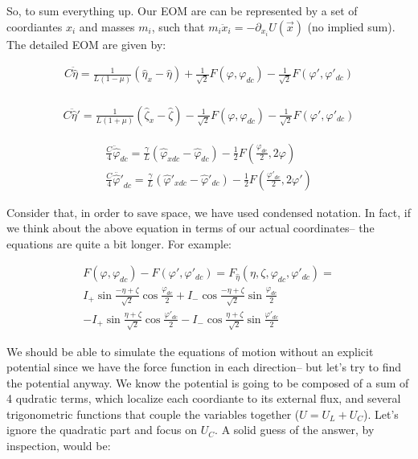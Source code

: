 \documentclass[paper=a4, twocolumn, fontsize=10pt]{article} %
\numberwithin{equation}{section} %
\numberwithin{figure}{section} %
\numberwithin{table}{section} %
\def \df#1{\hat{#1}}
\def \dl#1{#1}
\begin{document}
So, to sum everything up. Our EOM are can be represented by a set of coordiantes $x_i$ and masses $m_i$, such that $m_i \ddot{x}_i = -\partial_{x_i} U(\vec{x})$ (no implied sum). The detailed EOM are given by:


\begin{multline}
    C \ddot{\df\eta} = \frac{1}{L(1-\mu)} (\df\eta_x-\df\eta) +\frac{1}{\sqrt{2}} F(\dl\varphi, \dl\varphi_{dc}) - \frac{1}{\sqrt{2}} F(\dl\varphi', \dl\varphi'_{dc})
\end{multline}
    \\
\begin{multline}
    C \ddot{\df\eta}' = \frac{1}{L(1+\mu)} (\df\zeta_x-\df\zeta) - \frac{1}{\sqrt{2}} F(\dl\varphi, \dl\varphi_{dc}) - \frac{1}{\sqrt{2}} F(\dl\varphi', \dl\varphi'_{dc})
\end{multline}

\begin{align}
\frac{C}{4} \ddot{\df\varphi}_{dc} = \frac{\gamma}{L}\left( \df\varphi_{xdc} -\df\varphi_{dc}\right) -  \frac{1}{2} F(\frac{\dl\varphi_{dc}}{2}, 2\dl\varphi) \\
\frac{C}{4} \ddot{\df\varphi'}_{dc} = \frac{\gamma}{L}\left( \df\varphi'_{xdc} -\df\varphi'_{dc}\right) -  \frac{1}{2}F(\frac{\dl\varphi'_{dc}}{2}, 2\dl\varphi')
    \end{align}

Consider that, in order to save space, we have used condensed notation. In fact, if we think about the above equation in terms of our actual coordinates-- the equations are quite a bit longer. For example:


\begin{multline}
    F(\dl\varphi, \dl\varphi_{dc}) - F(\dl\varphi', \dl\varphi'_{dc}) = F_{\df\eta}(\dl\eta,\dl\zeta,\dl\varphi_{dc},\dl\varphi'_{dc})   =  \\
    I_{+} \sin \frac{-\dl\eta+\dl\zeta}{\sqrt2} \cos \frac{\dl\varphi_{dc}}{2} + I_{-} \cos \frac{-\dl\eta+\dl\zeta}{\sqrt2} \sin \frac{\dl\varphi_{dc}}{2} \\
    - I_{+} \sin \frac{\dl\eta+\dl\zeta}{\sqrt2} \cos \frac{\dl\varphi'_{dc}}{2} - I_{-} \cos \frac{\dl\eta+\dl\zeta}{\sqrt2} \sin \frac{\dl\varphi'_{dc}}{2} 
\end{multline}

We should be able to simulate the equations of motion without an explicit potential since we have the force function in each direction-- but let's try to find the potential anyway. We know the potential is going to be composed of a sum of 4 qudratic terms, which localize each coordiante to its external flux, and several trigonometric functions that couple the variables together ($U=U_L+ U_C$). Let's ignore the quadratic part and focus on $U_C$. A solid guess of the answer, by inspection, would be:
\end{document}
